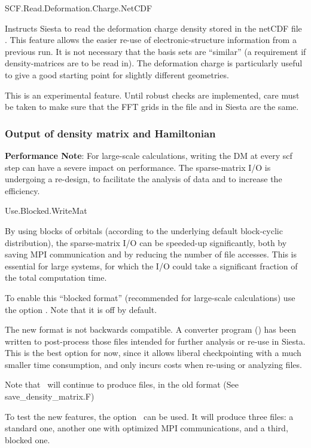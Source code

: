 \begin{fdflogicalF}{SCF.Read.Deformation.Charge.NetCDF}
  
  Instructs Siesta to read the deformation charge density stored in
  the netCDF file . This feature allows the
  easier re-use of electronic-structure information from a previous
  run. It is not necessary that the basis sets are ``similar'' (a
  requirement if density-matrices are to be read in). The deformation
  charge is particularly useful to give a good starting point for
  slightly different geometries.

  \note This is an experimental feature. Until robust checks are
  implemented, care must be taken to make sure that the FFT grids in
  the  file and in Siesta are the same.

\end{fdflogicalF}


\subsubsection{Output of density matrix and Hamiltonian}

\textbf{Performance Note}: For large-scale calculations, writing the DM
at every scf step can have a severe impact on performance. 
The sparse-matrix I/O is undergoing a re-design, to facilitate the
analysis of data and to increase the efficiency. 

\begin{fdflogicalF}{Use.Blocked.WriteMat}

  By using blocks of orbitals (according to the underlying default
  block-cyclic distribution), the sparse-matrix I/O can be speeded-up
  significantly, both by saving MPI communication and by reducing the
  number of file accesses. This is essential for large systems, for
  which the I/O could take a significant fraction of the total
  computation time.
  
  To enable this ``blocked format'' (recommended for large-scale
  calculations) use the option 
  \fdftrue. Note that it is off by default.
  
  The new format is not backwards compatible. A converter program
  () has been written to
  post-process those files intended for further analysis or re-use in
  Siesta. This is the best option for now, since it allows liberal
  checkpointing with a much smaller time consumption, and only incurs
  costs when re-using or analyzing files.
  
  Note that \tsiesta\ will continue to produce  files, in
  the old format (See save\_density\_matrix.F)

  To test the new features, the option  \fdftrue\ can be
  used. It will produce three files: a standard one, another one with
  optimized MPI communications, and a third, blocked one.

\end{fdflogicalF}

